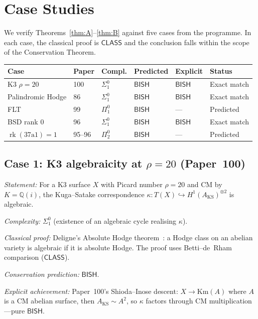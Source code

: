 \documentclass[11pt,a4paper]{article}
\theoremstyle{plain}
\theoremstyle{definition}
\newcommand{\BISH}{\textsf{BISH}}
\newcommand{\CLASS}{\textsf{CLASS}}
\newcommand{\Q}{\mathbb{Q}}
\DeclareMathOperator{\rk}{rk}
\begin{document}
\section{Case Studies}\label{sec:cases}

We verify Theorems~\ref{thm:A}--\ref{thm:B} against five cases from the programme.  In each case, the classical proof is $\CLASS$ and the conclusion falls within the scope of the Conservation Theorem.

\begin{center}
\begin{tabular}{llllll}
\toprule
\textbf{Case} & \textbf{Paper} & \textbf{Compl.} & \textbf{Predicted} & \textbf{Explicit} & \textbf{Status} \\
\midrule
K3 $\rho = 20$ & 100 & $\Sigma^0_1$ & $\BISH$ & $\BISH$ & Exact match \\
Palindromic Hodge & 86 & $\Sigma^0_1$ & $\BISH$ & $\BISH$ & Exact match \\
FLT & 99 & $\Pi^0_1$ & $\BISH$ & --- & Predicted \\
BSD rank 0 & 96 & $\Sigma^0_1$ & $\BISH$ & $\BISH$ & Exact match \\
$\rk(37\mathrm{a}1) = 1$ & 95--96 & $\Pi^0_2$ & $\BISH$ & --- & Predicted \\
\bottomrule
\end{tabular}
\end{center}

\subsection{Case 1: K3 algebraicity at $\rho = 20$ (Paper~100)}

\emph{Statement:} For a K3 surface $X$ with Picard number $\rho = 20$ and CM by $K = \Q(i)$, the Kuga--Satake correspondence $\kappa : T(X) \hookrightarrow H^1(A_{\mathrm{KS}})^{\otimes 2}$ is algebraic.

\emph{Complexity:} $\Sigma^0_1$ (existence of an algebraic cycle realising $\kappa$).

\emph{Classical proof:} Deligne's Absolute Hodge theorem~\cite{deligne-absolute}: a Hodge class on an abelian variety is algebraic if it is absolute Hodge.  The proof uses Betti--de~Rham comparison ($\CLASS$).

\emph{Conservation prediction:} $\BISH$.

\emph{Explicit achievement:} Paper~100's Shioda--Inose descent: $X \to \mathrm{Km}(A)$ where $A$ is a CM abelian surface, then $A_{\mathrm{KS}} \sim A^2$, so $\kappa$ factors through CM multiplication---pure $\BISH$.
\end{document}
